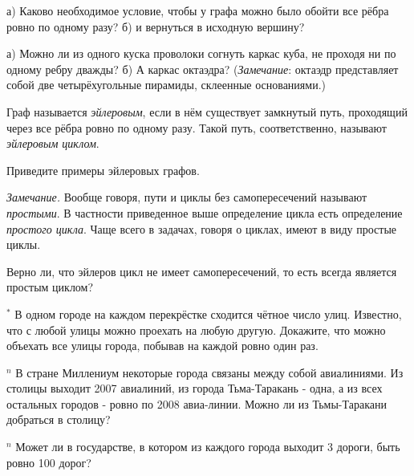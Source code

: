 \begin{thm}
    а) Каково необходимое условие, чтобы у графа можно было обойти все рёбра ровно по одному разу? б) и вернуться в исходную вершину?
\end{thm}

\begin{thm}
    а) Можно ли из одного куска проволоки согнуть каркас куба, не проходя ни по одному ребру дважды? б) А каркас октаэдра? (\textit{Замечание}: октаэдр представляет собой две четырёхугольные пирамиды, склеенные основаниями.)
\end{thm}

\begin{dfn}
    Граф называется \textit{эйлеровым}, если в нём существует замкнутый путь, проходящий через все рёбра ровно по одному разу. Такой путь, соответственно, называют \textit{эйлеровым циклом}.
\end{dfn}

\begin{ex}
    Приведите примеры эйлеровых графов.
\end{ex}        

\textit{Замечание.} Вообще говоря, пути и циклы без самопересечений называют \textit{простыми}. В частности приведенное выше определение цикла есть определение \textit{простого цикла}. Чаще всего в задачах, говоря о циклах, имеют в виду простые циклы.

\begin{ques}
    Верно ли, что эйлеров цикл не имеет самопересечений, то есть всегда является простым циклом?
\end{ques}


\begin{thm} $^*$
    В одном городе на каждом перекрёстке сходится чётное число улиц. Известно, что с любой улицы можно проехать на любую другую. Докажите, что можно объехать все улицы города, побывав на каждой ровно один раз.    
\end{thm}

\begin{thm} $^n$
    В стране Миллениум некоторые города связаны между собой авиалиниями. Из столицы выходит 2007 авиалиний, из города Тьма-Таракань - одна, а из всех остальных городов - ровно по 2008 авиа-линии. Можно ли из Тьмы-Таракани добраться в столицу?
\end{thm}

\begin{thm} $^n$
    Может ли в государстве, в котором из каждого города выходит 3 дороги, быть ровно 100 дорог?
\end{thm}

